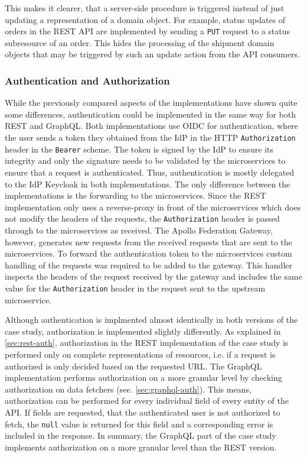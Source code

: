 This makes it clearer, that a server-side procedure is triggered instead of just updating a representation of a domain object.
For example, status updates of orders in the \ac{REST} \ac{API} are implemented by sending a \texttt{PUT} request to a status subresource of an order.
This hides the processing of the shipment domain objects that may be triggered by such an update action from the \ac{API} consumers.

\subsubsection{Authentication and Authorization}

While the previously compared aspects of the implementations have shown quite some differences, authentication could be implemented in the same way for both \ac{REST} and GraphQL.
Both implementations use \ac{OIDC} for authentication, where the user sends a token they obtained from the \ac{IdP} in the \ac{HTTP} \texttt{Authorization} header in the \texttt{Bearer} scheme.
The token is signed by the \ac{IdP} to ensure its integrity and only the signature needs to be validated by the microservices to ensure that a request is authenticated.
Thus, authentication is mostly delegated to the \ac{IdP} Keycloak in both implementations.
The only difference between the implementations is the forwarding to the microservices.
Since the \ac{REST} implementation only uses a reverse-proxy in front of the microservices which does not modify the headers of the requests, the \texttt{Authorization} header is passed through to the microservices as received.
The Apollo Federation Gateway, however, generates new requests from the received requests that are sent to the microservices.
To forward the authentication token to the microservices custom handling of the requests was required to be added to the gateway.
This handler inspects the headers of the request received by the gateway and includes the same value for the \texttt{Authorization} header in the request sent to the upstream microservice.

Although authentication is implmented almost identically in both versions of the case study, authorization is implemented slightly differently.
As explained in \autoref{sec:rest-auth}, authorization in the \ac{REST} implementation of the case study is performed only on complete representations of resources, i.e. if a request is authorized is only decided based on the requested \ac{URL}.
The GraphQL implementation performs authorization on a more granular level by checking authorization on data fetchers (see. \autoref{sec:graphql-auth}).
This means, authorization can be performed for every individual field of every entity of the \ac{API}.
If fields are requested, that the authenticated user is not authorized to fetch, the \texttt{null} value is returned for this field and a corresponding error is included in the response.
In summary, the GraphQL part of the case study implements authorization on a more granular level than the \ac{REST} version.

